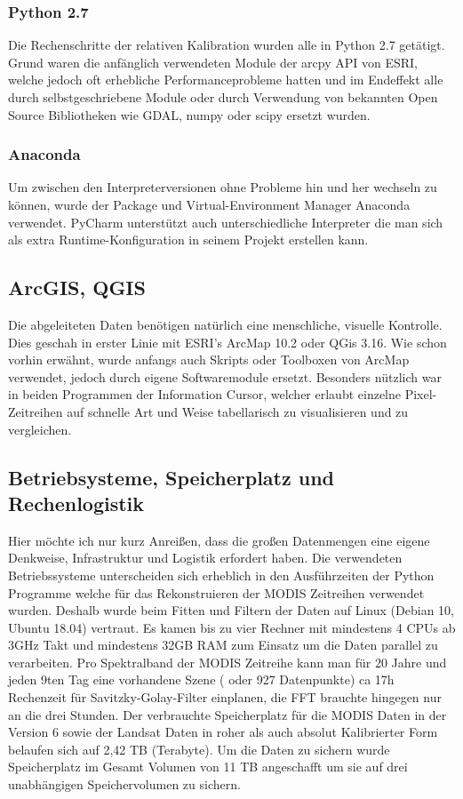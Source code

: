 \documentclass[11pt]{report}
\begin{document}
\subsubsection{Python 2.7}
Die Rechenschritte der relativen Kalibration wurden alle in Python 2.7 getätigt. Grund waren die anfänglich verwendeten Module der arcpy API von ESRI, welche jedoch oft erhebliche Performanceprobleme hatten und im Endeffekt alle durch selbstgeschriebene Module oder durch Verwendung von bekannten Open Source Bibliotheken wie GDAL, numpy oder scipy ersetzt wurden.

\subsubsection{Anaconda}
Um zwischen den Interpreterversionen ohne Probleme hin und her wechseln zu können, wurde der Package und Virtual-Environment Manager Anaconda verwendet. PyCharm unterstützt auch unterschiedliche Interpreter die man sich als extra Runtime-Konfiguration in seinem Projekt erstellen kann.
\subsection{ArcGIS, QGIS}
Die abgeleiteten Daten benötigen natürlich eine menschliche, visuelle Kontrolle. Dies geschah in erster Linie mit ESRI's ArcMap 10.2 oder QGis 3.16. Wie schon vorhin erwähnt, wurde anfangs auch Skripts oder Toolboxen von ArcMap verwendet, jedoch durch eigene Softwaremodule ersetzt. Besonders nützlich war in beiden Programmen der Information Cursor, welcher erlaubt einzelne Pixel-Zeitreihen auf schnelle Art und Weise tabellarisch zu visualisieren und zu vergleichen. 

\subsection{Betriebsysteme, Speicherplatz und Rechenlogistik}
Hier möchte ich nur kurz Anreißen, dass die großen Datenmengen eine eigene Denkweise, Infrastruktur und Logistik erfordert haben.
Die verwendeten Betriebssysteme unterscheiden sich erheblich in den Ausführzeiten der Python Programme welche für das Rekonstruieren der MODIS Zeitreihen verwendet wurden. Deshalb wurde beim Fitten und Filtern der Daten auf Linux (Debian 10, Ubuntu 18.04) vertraut. Es kamen bis zu vier Rechner mit mindestens 4 CPUs ab 3GHz Takt und mindestens 32GB RAM zum Einsatz um die Daten parallel zu verarbeiten. Pro Spektralband der MODIS Zeitreihe kann man für 20 Jahre und jeden 9ten Tag eine vorhandene Szene ( oder 927 Datenpunkte) ca 17h Rechenzeit für Savitzky-Golay-Filter einplanen, die FFT brauchte hingegen nur an die drei Stunden. Der verbrauchte Speicherplatz für die MODIS Daten in der Version 6 sowie der Landsat Daten in roher als auch absolut Kalibrierter Form belaufen sich auf 2,42 TB (Terabyte). Um die Daten zu sichern wurde Speicherplatz im Gesamt Volumen von 11 TB angeschafft um sie auf drei unabhängigen Speichervolumen zu sichern. 
\end{document}
